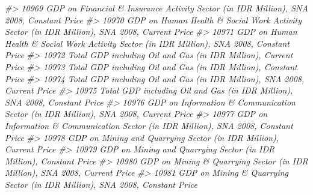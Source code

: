 \documentclass[
]{bxjsbook}
\newenvironment{Shaded}{\begin{snugshade}}{\end{snugshade}}
\newcommand{\CommentTok}[1]{\textcolor[rgb]{0.56,0.35,0.01}{\textit{#1}}}
\theoremstyle{definition}
\theoremstyle{definition}
\theoremstyle{definition}
\theoremstyle{definition}
\theoremstyle{remark}
\begin{document}
\begin{Shaded}
\begin{Highlighting}[]
\CommentTok{\#\textgreater{} 10969                                                                                   GDP on Financial \& Insurance Activity Sector (in IDR Million), SNA 2008, Constant Price}
\CommentTok{\#\textgreater{} 10970                                                                               GDP on Human Health \& Social Work Activity Sector (in IDR Million), SNA 2008, Current Price}
\CommentTok{\#\textgreater{} 10971                                                                              GDP on Human Health \& Social Work Activity Sector (in IDR Million), SNA 2008, Constant Price}
\CommentTok{\#\textgreater{} 10972                                                                                                           Total GDP including Oil and Gas (in IDR Million), Current Price}
\CommentTok{\#\textgreater{} 10973                                                                                                          Total GDP including Oil and Gas (in IDR Million), Constant Price}
\CommentTok{\#\textgreater{} 10974                                                                                                 Total GDP including Oil and Gas (in IDR Million), SNA 2008, Current Price}
\CommentTok{\#\textgreater{} 10975                                                                                                Total GDP including Oil and Gas (in IDR Million), SNA 2008, Constant Price}
\CommentTok{\#\textgreater{} 10976                                                                                       GDP on Information \& Communication Sector (in IDR Million), SNA 2008, Current Price}
\CommentTok{\#\textgreater{} 10977                                                                                      GDP on Information \& Communication Sector (in IDR Million), SNA 2008, Constant Price}
\CommentTok{\#\textgreater{} 10978                                                                                                        GDP on Mining and Quarrying Sector (in IDR Million), Current Price}
\CommentTok{\#\textgreater{} 10979                                                                                                       GDP on Mining and Quarrying Sector (in IDR Million), Constant Price}
\CommentTok{\#\textgreater{} 10980                                                                                                GDP on Mining \& Quarrying Sector (in IDR Million), SNA 2008, Current Price}
\CommentTok{\#\textgreater{} 10981                                                                                               GDP on Mining \& Quarrying Sector (in IDR Million), SNA 2008, Constant Price}

\end{Highlighting}
\end{Shaded}
\end{document}
